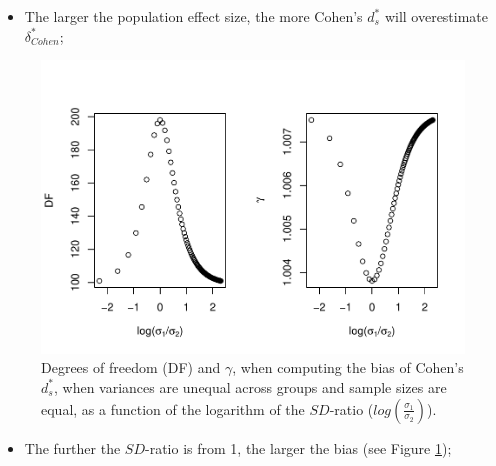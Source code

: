 \documentclass[
  english,
  man,mask]{apa6}
\providecommand{\tightlist}{%
  \setlength{\itemsep}{0pt}\setlength{\parskip}{0pt}}
\begin{document}
\begin{itemize}
\tightlist
\item
  The larger the population effect size, the more Cohen's \(d^*_s\) will overestimate \(\delta^*_{Cohen}\);
\end{itemize}

\begin{figure}
\centering
\includegraphics{Theoretical-Bias-of-all-estimators-as-a-function-of-population-parameters_files/figure-latex/biascohendprimehetbalSDratio2-1.pdf}
\caption{\label{fig:biascohendprimehetbalSDratio2}Degrees of freedom (DF) and \(\gamma\), when computing the bias of Cohen's \(d^*_s\), when variances are unequal across groups and sample sizes are equal, as a function of the logarithm of the \(SD\)-ratio (\(log \left( \frac{\sigma_1}{\sigma_2} \right)\)).}
\end{figure}

\begin{itemize}
\tightlist
\item
  The further the \(SD\)-ratio is from 1, the larger the bias (see Figure \ref{fig:biascohendprimehetbalSDratio2});
\end{itemize}
\end{document}
